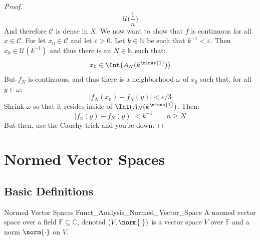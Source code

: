 \begin{proof}
\begin{equation}
                    \mathcal{U}\big(\frac{1}{n}\big)
            \end{equation}
            And therefore $\mathcal{C}$ is dense in $X$. We
            now want to show that $f$ is continuous for all
            $x\in\mathcal{C}$. For let $x_{0}\in\mathcal{C}$ and
            let $\varepsilon>0$. Let $k\in\mathbb{N}$ be such that
            $k^{\minus{1}}<\varepsilon$. Then
            $x_{0}\in\mathcal{U}(k^{\minus{1}})$ and thus there is
            an $N\in\mathbb{N}$ such that:
            \begin{equation}
                x_{0}\in\Int\big(A_{N}(k^{\minus{1}})\big)
            \end{equation}
            But $f_{N}$ is continuous, and thus there is a
            neighborhood $\omega$ of $x_{0}$ such that, for all
            $y\in\omega$:
            \begin{equation}
                |f_{N}(x_{0})-f_{N}(y)|<\varepsilon/3
            \end{equation}
            Shrink $\omega$ so that it resides inside of
            $\Int(A_{N}(k^{\minus{1}})$. Then:
            \begin{equation}
                |f_{n}(y)-f_{N}(y)|<k^{\minus{1}}
                \quad\quad
                n\geq{N}
            \end{equation}
            But then, use the Cauchy trick and you're down.
        \end{proof}
        \newpage
    \section{Normed Vector Spaces}
        \subsection{Basic Definitions}
            \begin{ldefinition}{Normed Vector Spaces}
                  {Funct_Analysis_Normed_Vector_Space}
                A normed vector space over a field
                $\mathbb{F}\subseteq\mathbb{C}$, denoted
                $(V,\norm{\cdot})$ is a vector space $V$ over
                $\mathbb{F}$ and a norm $\norm{\cdot}$ on $V$.
            \end{ldefinition}
